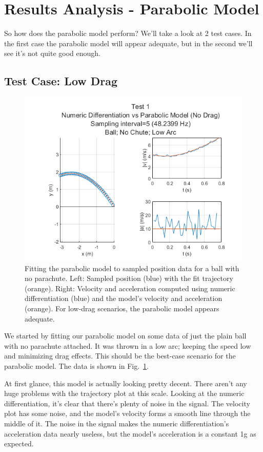\section{Results Analysis - Parabolic Model}

So how does the parabolic model perform? We'll take a look at 2 test cases. In the first case the parabolic model will appear adequate, but in the second we'll see it's not quite good enough.

\subsection{Test Case: Low Drag}


\begin{figure}[t]
\centering
\includegraphics[width=0.9\linewidth]{images/Analysis1_Test1_Fig5_NoDrag.png}
\caption{\label{fig:Analysis1_Test1_Fig5_NoDrag} Fitting the parabolic model to sampled position data for a ball with no parachute. Left: Sampled position (blue) with the fit trajectory (orange). Right: Velocity and acceleration computed using numeric differentiation (blue) and the model's velocity and acceleration (orange). For low-drag scenarios, the parabolic model appears adequate.}
\end{figure}

We started by fitting our parabolic model on some data of just the plain ball with no parachute attached. It was thrown in a low arc; keeping the speed low and minimizing drag effects. This should be the best-case scenario for the parabolic model. The data is shown in Fig.~\ref{fig:Analysis1_Test1_Fig5_NoDrag}. 

At first glance, this model is actually looking pretty decent. There aren't any huge problems with the trajectory plot at this scale. Looking at the numeric differentiation, it's clear that there's plenty of noise in the signal. The velocity plot has some noise, and the model's velocity forms a smooth line through the middle of it. The noise in the signal makes the numeric differentiation's acceleration data nearly useless, but the model's acceleration is a constant 1g as expected. 

